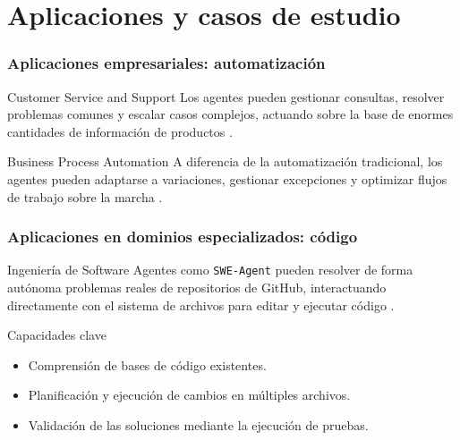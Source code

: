\documentclass[handout]{beamer}
\begin{document}
\section{Aplicaciones y casos de estudio}
\begin{frame}
  \frametitle{Aplicaciones empresariales: automatización}
    \begin{block}{Customer Service and Support}
        Los agentes pueden gestionar consultas, resolver problemas comunes y escalar casos complejos, actuando sobre la base de enormes cantidades de información de productos \parencite{krishnan2025aiagentsevolutionarchitecture}.
    \end{block}
    \begin{exampleblock}{Business Process Automation}
        A diferencia de la automatización tradicional, los agentes pueden adaptarse a variaciones, gestionar excepciones y optimizar flujos de trabajo sobre la marcha \parencite[citado en][]{jeong2025studymcpxa2a}.
    \end{exampleblock}
\end{frame}

\begin{frame}
    \frametitle{Aplicaciones en dominios especializados: código}
    \begin{block}{Ingeniería de Software}
        Agentes como \texttt{SWE-Agent} pueden resolver de forma autónoma problemas reales de repositorios de GitHub, interactuando directamente con el sistema de archivos para editar y ejecutar código \parencite{jimenez2023swebench}.
    \end{block}
    \begin{exampleblock}{Capacidades clave}
        \begin{itemize}
            \item Comprensión de bases de código existentes.
            \item Planificación y ejecución de cambios en múltiples archivos.
            \item Validación de las soluciones mediante la ejecución de pruebas.
        \end{itemize}
    \end{exampleblock}
\end{frame}
\end{document}

